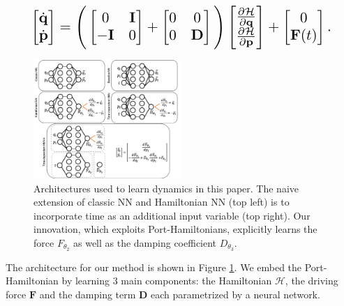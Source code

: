 \documentclass[twoside]{article}
\begin{document}
\begin{equation}
\resizebox{0.9\linewidth}{!}{$%
\begin{bmatrix}
\dot{\mathbf{q}} \\
\dot{\mathbf{p}}
\end{bmatrix}
=
\Bigg(\begin{bmatrix}
0 & \mathbf{I} \\
-\mathbf{I} & 0
\end{bmatrix} +
\begin{bmatrix}
0 & 0 \\
0 & \mathbf{D}
\end{bmatrix}
 \Bigg)
 \begin{bmatrix}
\frac{\partial \mathcal{H}}{\partial \mathbf{q}} \\
\frac{\partial \mathcal{H}}{\partial \mathbf{p}}
\end{bmatrix}
+
\begin{bmatrix}
0 \\
\mathbf{F}(t)
\end{bmatrix}.
$%
}%
\label{eqn.pham1}
\end{equation}
\begin{figure}[h!]
\centering
\includegraphics[width=0.5\textwidth]{figures/architect.png}
\caption{Architectures used to learn dynamics in this paper. The naive extension of classic NN and Hamiltonian NN (top left) is to incorporate time as an additional input variable (top right). Our innovation, which exploits Port-Hamiltonians, explicitly learns the force $F_{\theta_2}$ as well as the damping coefficient $D_{\theta_3}$.}
\label{fig.architecture}
\end{figure}

The architecture for our method is shown in Figure \ref{fig.architecture}. We embed the Port-Hamiltonian by learning 3 main components: the Hamiltonian $\mathcal{H}$, the driving force $\mathbf{F}$ and the damping term $\mathbf{D}$ each parametrized by a neural network.
\end{document}
